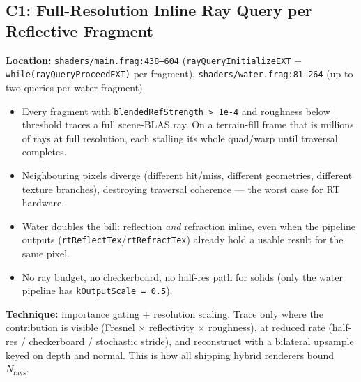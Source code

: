 \documentclass[11pt,a4paper]{article}
\begin{document}
\subsection{C1: Full-Resolution Inline Ray Query per Reflective Fragment}

\textbf{Location:} \texttt{shaders/main.frag:438--604} (\texttt{rayQueryInitializeEXT} $+$ \texttt{while(rayQueryProceedEXT)} per fragment), \texttt{shaders/water.frag:81--264} (up to two queries per water fragment).

\begin{itemize}
    \item Every fragment with \texttt{blendedRefStrength \textgreater{} 1e-4} and roughness below threshold traces a full scene-BLAS ray. On a terrain-fill frame that is millions of rays at full resolution, each stalling its whole quad/warp until traversal completes.
    \item Neighbouring pixels diverge (different hit/miss, different geometries, different texture branches), destroying traversal coherence --- the worst case for RT hardware.
    \item Water doubles the bill: reflection \textit{and} refraction inline, even when the pipeline outputs (\texttt{rtReflectTex}/\texttt{rtRefractTex}) already hold a usable result for the same pixel.
    \item No ray budget, no checkerboard, no half-res path for solids (only the water pipeline has \texttt{kOutputScale = 0.5}).
\end{itemize}

\textbf{Technique:} importance gating $+$ resolution scaling. Trace only where the contribution is visible (Fresnel $\times$ reflectivity $\times$ roughness), at reduced rate (half-res / checkerboard / stochastic stride), and reconstruct with a bilateral upsample keyed on depth and normal. This is how all shipping hybrid renderers bound $N_{\mathrm{rays}}$.
\end{document}
